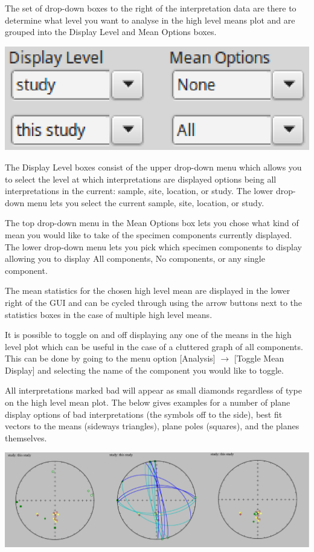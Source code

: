 \documentclass[11pt]{book}
\begin{document}
{{The set of drop-down boxes to the right of the interpretation data are there to determine what level you want to analyse in the high level means plot and are grouped into the Display Level and Mean Options boxes.

\includegraphics[width=8 cm]{EPSFiles/demag_gui_HighLevel.eps}

\noindent The Display Level boxes consist of the upper drop-down menu which allows you to select the level at which interpretations are displayed options being all interpretations in the current: sample, site, location, or study. The lower drop-down menu lets you select the current sample, site, location, or study.

\noindent The top drop-down menu in the Mean Options box lets you chose what kind of mean you would like to take of the specimen components currently displayed. The lower drop-down menu lets you pick which specimen components to display allowing you to display All components, No components, or any single component.

\noindent The mean statistics for the chosen high level mean are displayed in the lower right of the GUI and can be cycled through using the arrow buttons next to the statistics boxes in the case of multiple high level means.

\noindent It is possible to toggle on and off displaying any one of the means in the high level plot which can be useful in the case of a cluttered graph of all components. This can be done by going to the menu option [Analysis] $\rightarrow$ [Toggle Mean Display] and selecting the name of the component you would like to toggle.

\noindent All interpretations marked bad will appear as small diamonds regardless of type on the high level mean plot. The below gives examples for a number of plane display options of bad interpretations (the symbols off to the side), best fit vectors to the means (sideways triangles), plane poles (squares), and the planes themselves.

\includegraphics[width=30 cm]{EPSFiles/demag_gui_HLMTypes.eps}

}}
\end{document}
